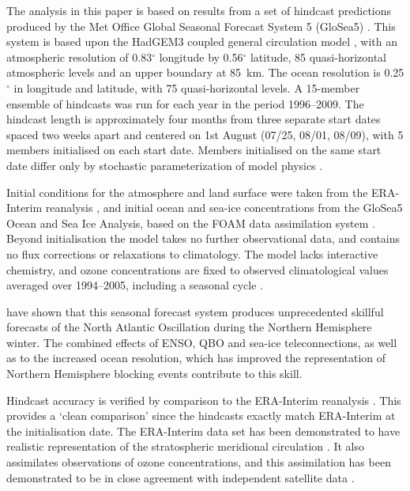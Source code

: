 The analysis in this paper is based on results from a set of hindcast
predictions produced by the Met Office Global Seasonal Forecast System 5
(GloSea5) \citep{MacLachlan2014}. This system is based upon the HadGEM3 coupled
general circulation model \citep{Hewitt2011}, with an atmospheric resolution of
0.83$^{\circ}$ longitude by 0.56$^{\circ}$ latitude, 85 quasi-horizontal
atmospheric levels and an upper boundary at 85~km. The ocean resolution is
0.25$^{\circ}$ in longitude and latitude, with 75 quasi-horizontal levels. A
15-member ensemble of hindcasts was run for each year in the period
1996--2009. The hindcast length is approximately four months from three separate
start dates spaced two weeks apart and centered on 1st August (07/25, 08/01,
08/09), with 5 members initialised on each start date. Members initialised on
the same start date differ only by stochastic parameterization of model physics
\citep{Tennant2011}.

Initial conditions for the atmosphere and land surface were taken from the
ERA-Interim reanalysis \citep{Dee2011}, and initial ocean and sea-ice
concentrations from the GloSea5 Ocean and Sea Ice Analysis, based on the FOAM
data assimilation system \citep{Blockley2013}. Beyond initialisation the model
takes no further observational data, and contains no flux corrections or
relaxations to climatology. The model lacks interactive chemistry, and ozone
concentrations are fixed to observed climatological values averaged over
1994--2005, including a seasonal cycle \citep{Cionni2011}.

\citet{Scaife2013} have shown that this seasonal forecast system produces
unprecedented skillful forecasts of the North Atlantic Oscillation during the
Northern Hemisphere winter. The combined effects of ENSO, QBO and sea-ice
teleconnections, as well as to the increased ocean resolution, which has
improved the representation of Northern Hemisphere blocking events
\citep{Scaife2011a} contribute to this skill.

Hindcast accuracy is verified by comparison to the ERA-Interim reanalysis
\citep{Dee2011}. This provides a `clean comparison' since the hindcasts exactly
match ERA-Interim at the initialisation date. The ERA-Interim data set has been
demonstrated to have realistic representation of the stratospheric meridional
circulation \citep{Seviour2012, Monge-Sanz2013}. It also assimilates
observations of ozone concentrations, and this assimilation has been
demonstrated to be in close agreement with independent satellite data
\citep{Dragani2011}.

